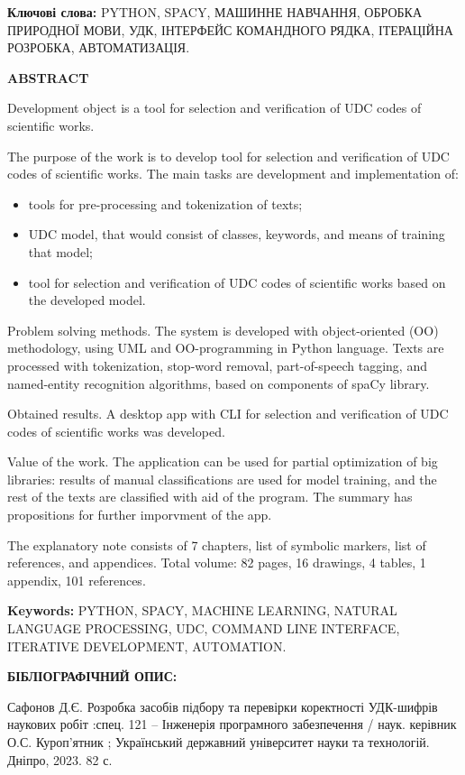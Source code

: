 \documentclass[14pt]{extarticle}
\begin{document}
\textbf{Ключові слова:} \MakeUppercase{python, spaCy, машинне навчання, обробка природної мови,
УДК, інтерфейс командного рядка, ітераційна розробка, автоматизація.}

\newpage

\noindent
\textbf{ABSTRACT}

Development object is a tool for selection and
verification of UDC codes of scientific works.

The purpose of the work is to develop tool for selection and
verification of UDC codes of scientific works. The main tasks are development
and implementation of:

\begin{itemize}[itemsep=1pt,labelindent=\dimexpr{}\relax, leftmargin=*]
  \item tools for pre-processing and tokenization of texts;
  \item UDC model, that would consist of classes, keywords, and means of
	training that model;
  \item tool for selection and verification of UDC codes of scientific works
	based on the developed model.
\end{itemize}

Problem solving methods. The system is developed with object-oriented (OO)
methodology, using UML and OO-programming in Python language.
Texts are processed with tokenization, stop-word removal, part-of-speech tagging,
and named-entity recognition algorithms, based on components of spaCy library.

Obtained results. A desktop app with CLI for selection and
verification of UDC codes of scientific works was developed.

Value of the work. The application can be used for partial optimization of
big libraries: results of manual classifications are used for model training,
and the rest of the texts are classified with aid of the program.
The summary has propositions for further imporvment of the app.

The explanatory note consists of 7 chapters, list of symbolic markers,
list of references, and appendices.
Total volume: 82 pages, 16 drawings, 4 tables, 1 appendix, 101 references.

\textbf{Keywords:} \MakeUppercase{python, spaCy, machine learning,
Natural language processing,
UDC, command line interface, iterative development, automation.}

\newpage
\noindent
\textbf{БІБЛІОГРАФІЧНИЙ ОПИС:}

Сафонов Д.Є.
Розробка засобів підбору та перевірки коректності УДК-шифрів наукових
робіт
:спец. 121 – Інженерія програмного забезпечення
/ наук. керівник О.С. Куроп'ятник ;
Український державний університет науки та технологій. Дніпро, 2023. 82 с.
\end{document}

